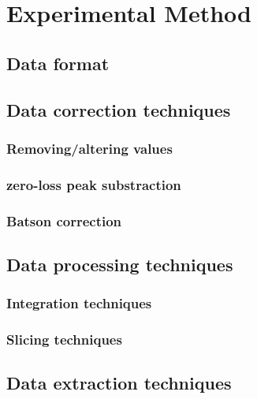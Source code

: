 \section{Experimental Method}
\subsection{Data format}
\subsection{Data correction techniques}
\subsubsection{Removing/altering values}
\subsubsection{zero-loss peak substraction}
\subsubsection{Batson correction}
\subsection{Data processing techniques}
\subsubsection{Integration techniques}
\subsubsection{Slicing techniques}
\subsection{Data extraction techniques}
